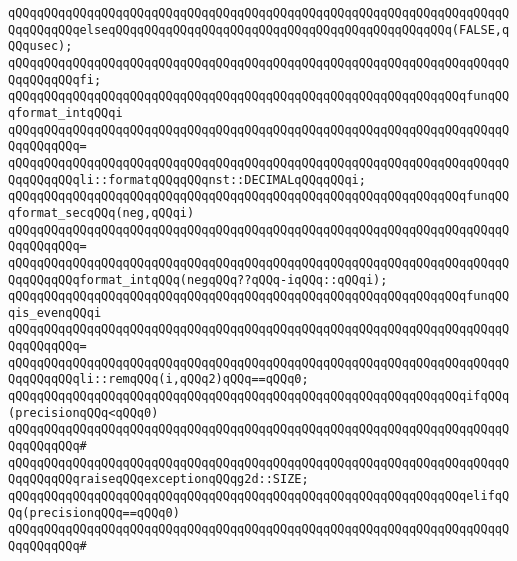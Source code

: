 \verb|qQQqqQQqqQQqqQQqqQQqqQQqqQQqqQQqqQQqqQQqqQQqqQQqqQQqqQQqqQQqqQQqqQQqqQQqqQQqqQQqelseqQQqqQQqqQQqqQQqqQQqqQQqqQQqqQQqqQQqqQQqqQQqqQQq(FALSE,qQQqusec);|\newline
\verb|qQQqqQQqqQQqqQQqqQQqqQQqqQQqqQQqqQQqqQQqqQQqqQQqqQQqqQQqqQQqqQQqqQQqqQQqqQQqqQQqfi;|\newline
\newline
\verb|qQQqqQQqqQQqqQQqqQQqqQQqqQQqqQQqqQQqqQQqqQQqqQQqqQQqqQQqqQQqqQQqfunqQQqformat_intqQQqi|\newline
\verb|qQQqqQQqqQQqqQQqqQQqqQQqqQQqqQQqqQQqqQQqqQQqqQQqqQQqqQQqqQQqqQQqqQQqqQQqqQQqqQQq=|\newline
\verb|qQQqqQQqqQQqqQQqqQQqqQQqqQQqqQQqqQQqqQQqqQQqqQQqqQQqqQQqqQQqqQQqqQQqqQQqqQQqqQQqli::formatqQQqqQQqnst::DECIMALqQQqqQQqi;|\newline
\newline
\verb|qQQqqQQqqQQqqQQqqQQqqQQqqQQqqQQqqQQqqQQqqQQqqQQqqQQqqQQqqQQqqQQqfunqQQqformat_secqQQq(neg,qQQqi)|\newline
\verb|qQQqqQQqqQQqqQQqqQQqqQQqqQQqqQQqqQQqqQQqqQQqqQQqqQQqqQQqqQQqqQQqqQQqqQQqqQQqqQQq=|\newline
\verb|qQQqqQQqqQQqqQQqqQQqqQQqqQQqqQQqqQQqqQQqqQQqqQQqqQQqqQQqqQQqqQQqqQQqqQQqqQQqqQQqformat_intqQQq(negqQQq??qQQq-iqQQq::qQQqi);|\newline
\newline
\verb|qQQqqQQqqQQqqQQqqQQqqQQqqQQqqQQqqQQqqQQqqQQqqQQqqQQqqQQqqQQqqQQqfunqQQqis_evenqQQqi|\newline
\verb|qQQqqQQqqQQqqQQqqQQqqQQqqQQqqQQqqQQqqQQqqQQqqQQqqQQqqQQqqQQqqQQqqQQqqQQqqQQqqQQq=|\newline
\verb|qQQqqQQqqQQqqQQqqQQqqQQqqQQqqQQqqQQqqQQqqQQqqQQqqQQqqQQqqQQqqQQqqQQqqQQqqQQqqQQqli::remqQQq(i,qQQq2)qQQq==qQQq0;|\newline
\newline
\verb|qQQqqQQqqQQqqQQqqQQqqQQqqQQqqQQqqQQqqQQqqQQqqQQqqQQqqQQqqQQqqQQqifqQQq(precisionqQQq<qQQq0)|\newline
\verb|qQQqqQQqqQQqqQQqqQQqqQQqqQQqqQQqqQQqqQQqqQQqqQQqqQQqqQQqqQQqqQQqqQQqqQQqqQQqqQQq#|\newline
\verb|qQQqqQQqqQQqqQQqqQQqqQQqqQQqqQQqqQQqqQQqqQQqqQQqqQQqqQQqqQQqqQQqqQQqqQQqqQQqqQQqraiseqQQqexceptionqQQqg2d::SIZE;|\newline
\newline
\verb|qQQqqQQqqQQqqQQqqQQqqQQqqQQqqQQqqQQqqQQqqQQqqQQqqQQqqQQqqQQqqQQqelifqQQq(precisionqQQq==qQQq0)|\newline
\verb|qQQqqQQqqQQqqQQqqQQqqQQqqQQqqQQqqQQqqQQqqQQqqQQqqQQqqQQqqQQqqQQqqQQqqQQqqQQqqQQq#|\newline
